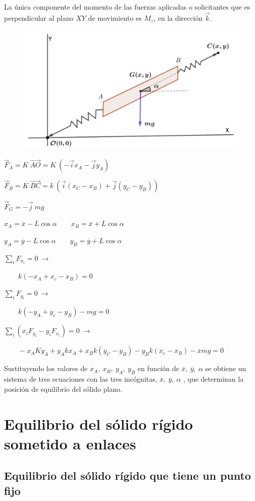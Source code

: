 La única componente del momento de las fuerzas aplicadas o solicitantes que es perpendicular al plano $XY$ de movimiento es $M_z$, en la dirección $\vec k$.
 
 \begin{figure}[H]
	\centering
	\includegraphics[width=.5\textwidth]{imagenes/imagenes06/T06IM05.png}
\end{figure}
 
 
 $\vec F_A=K\ \overrightarrow{AO}=K\ (-\vec i x_A-\vec j y_A)$
 
 $\vec F_B=K\ \overrightarrow{BC}=k\ (\vec i (x_C-x_B)+\vec j (y_C-y_B))$
 
 $\vec F_G=-\vec j\ mg$
 
 $x_A=\overline x-L\cos \alpha \qquad x_B=\overline x+L\cos \alpha$
 
  $y_A=\overline y-L\cos \alpha \qquad y_B=\overline y+L\cos \alpha$
 
  
$ \sum_i F_{x_i}=0 \ \to$ 
 
$\qquad k(-x_A+x_c-x_B)=0 $ 
    
$\sum_i F_{y_i}=0 \ \to$
 
$\qquad k(-y_A+y_c-y_B)-mg=0$
  
$ \sum_i(x_iF_{y_i}-y_iF_{x_i})=0 \ \to$

$\qquad  -x_AKy_A+y_Akx_A+x_Bk(y_C-y_B)-y_Bk(x_c-x_B)-\overline x mg=0 $
  
 Sustituyendo los valores de $x_A,\ x_B,\ y_A,\ y_B$ en función de $\overline x,\ \overline y,\ \alpha$ se obtiene un sistema de tres ecuaciones con las tres incógnitas, $\overline x,\ \overline y,\ \alpha$ , que determinan la posición de equilibrio del sólido plano.
 
 \section{Equilibrio del sólido rígido sometido a enlaces}
 \subsection{Equilibrio del sólido rígido que tiene un punto fijo}

